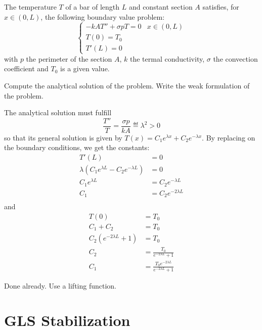 \begin{problem} The temperature $T$ of a bar of length $L$ and constant section $A$ satisfies, for $x ∈ (0,L)$, the following boundary value problem:
\[
\begin{cases}
- k AT'' + σpT = 0 & x ∈ (0,L) \\
T(0) = T_0 \\
T'(L) = 0
\end{cases}\] with $p$ the perimeter of the section $A$, $k$ the termal conductivity, $σ$ the convection coefficient and $T_0$ is a given value.

\ppart Compute the analytical solution of the problem.
\ppart Write the weak formulation of the problem.

\solution

\spart

The analytical solution must fulfill \[ \frac{T''}{T} = \frac{σp}{kA} ≝ λ^2 > 0 \] so that its general solution is given by $T(x) = C_1 e^{λx} + C_2 e^{-λx}$. By replacing on the boundary conditions, we get the constants:
\begin{align*}
T'(L) &= 0 \\
λ(C_1 e^{λL} - C_2 e^{-λL}) &= 0 \\
C_1 e^{λL} &= C_2 e^{-λL} \\
C_1 &= C_2 e^{-2λL} \\
\end{align*} and
\begin{align*}
T(0) &= T_0 \\
C_1 + C_2 &= T_0 \\
C_2(e^{-2λL} + 1) &= T_0 \\
C_2 &= \frac{T_0}{e^{-2λL} + 1} \\
C_1 &= \frac{T_0 e^{-2λL}}{e^{-2λL} + 1}
\end{align*}

\spart

Done already. Use a lifting function.

\end{problem}

\section{GLS Stabilization}

